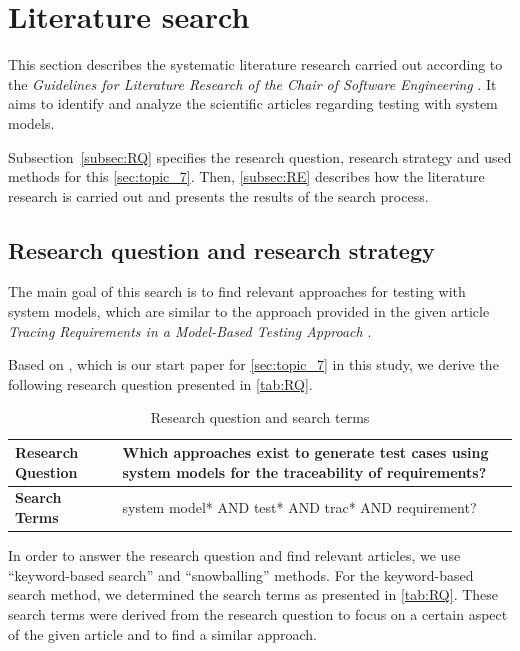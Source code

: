 \section{Literature search}
\label{sec:LS}

This section describes the systematic literature research carried out according to the \textit{Guidelines for Literature Research of the Chair of Software Engineering} \cite{LRGuidelines}. It aims to identify and analyze the scientific articles regarding testing with system models. 

Subsection~\ref{subsec:RQ} specifies the research question, research strategy and used methods for this \autoref{sec:topic_7}. Then, \autoref{subsec:RE} describes how the literature research is carried out and presents the results of the search process. 


\subsection*{Research question and research strategy}
\label{subsec:RQ}
The main goal of this search is to find relevant approaches for testing with system models, which are similar to the approach provided in the given article \textit{Tracing Requirements in a Model-Based Testing Approach} \cite{Paper1}. 

Based on \cite{Paper1}, which is our start paper for \autoref{sec:topic_7} in this study, we derive the following research question presented in \autoref{tab:RQ}.

\begin{table} [htb] 
\centering
\begin{small}
\caption{Research question and search terms}
\label{tab:RQ}
\setlength{\tabcolsep}{1em}
\begin{tabular}{ l| p{10cm}}
\hline
\textbf{Research Question} & Which approaches exist to generate test cases using system models for the traceability of requirements?\\
\hline
\textbf{Search Terms}  & system model* AND test* AND trac* AND requirement? \\
\hline
\end{tabular}
\end{small}
\end{table}

In order to answer the research question and find relevant articles, we use \enquote{keyword-based search} and \enquote{snowballing} methods. For the keyword-based search method, we determined the search terms as presented in \autoref{tab:RQ}. These search terms were derived from the research question to focus on a certain aspect of the given article \cite{Paper1} and to find a similar approach. 

